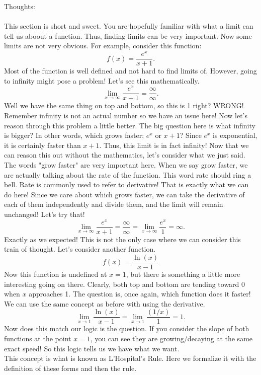 \documentclass[10pt]{article}
\theoremstyle{Theorem}
\theoremstyle{definition}
\theoremstyle{remark}
\theoremstyle{custom}
\begin{document}
\thispagestyle{firststyle}
\pagestyle{plain}

Thoughts:\\\\
This section is short and sweet. You are hopefully familiar with what a limit can tell us aboout a function. Thus, finding limits can be very important. Now some limits are not very obvious. For example, consider this function: 
\[
f(x)=\dfrac{e^x}{x+1}.
\]
Most of the function is well defined and not hard to find limits of. However, going to infinity might pose a problem! Let's see this mathematically.
\[
\lim_{x\rightarrow \infty}\dfrac{e^x}{x+1}=\dfrac{\infty}{\infty}.
\]
Well we have the same thing on top and bottom, so this is 1 right? WRONG! Remember infinity is not an actual number so we have an issue here! Now let's reason through this problem a little better. The big question here is what infinity is bigger? In other words, which grows faster; $e^x$ or $x+1$? Since $e^x$ is exponential, it is certainly faster than $x+1$. Thus, this limit is in fact infinity! Now that we can reason this out without the mathematics, let's consider what we just said. The words "grow faster" are very important here. When we say grow faster, we are actually talking about the rate of the function. This word rate should ring a bell. Rate is commonly used to refer to derivative! That is exactly what we can do here! Since we care about which grows faster, we can take the derivative of each of them independently and divide them, and the limit will remain unchanged! Let's try that!
\[
\lim_{x\rightarrow \infty}\dfrac{e^x}{x+1}=\dfrac{\infty}{\infty}=\lim_{x\rightarrow \infty}\dfrac{e^x}{1}=\infty.
\]
Exactly as we expected! This is not the only case where we can consider this train of thought. Let's consider another function.
\[
f(x)=\dfrac{\ln(x)}{x-1}
\]
Now this function is undefined at $x=1$, but there is something a little more interesting going on there. Clearly, both top and bottom are tending toward 0 when $x$ approaches 1. The question is, once again, which function does it faster! We can use the same concept as before with using the derivative.
\[
\lim_{x\rightarrow 1}\dfrac{\ln(x)}{x-1}=\lim_{x\rightarrow 1}\dfrac{(1/x)}{1}=1.
\]
Now does this match our logic is the question. If you consider the slope of both functions at the point $x=1$, you can see they are growing/decaying at the same exact speed! So this logic tells us we have what we want.\\
\newpage This concept is what is known as L'Hospital's Rule. Here we formalize it with the definition of these forms and then the rule.
\end{document}
